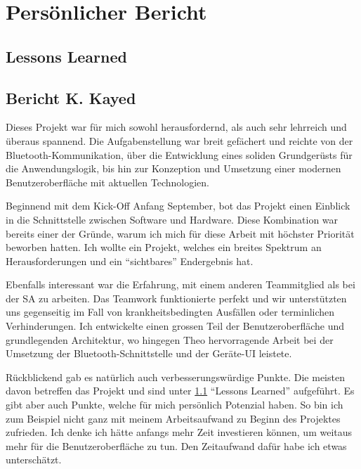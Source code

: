 \section{Persönlicher Bericht}
\label{Persönlicher Bericht}

\subsection{Lessons Learned}
\label{sub:lessons_learned}

\subsection{Bericht K. Kayed}

Dieses Projekt war für mich sowohl herausfordernd, als auch sehr lehrreich und überaus spannend. Die Aufgabenstellung war breit gefächert und reichte von der Bluetooth-Kommunikation, über die Entwicklung eines soliden Grundgerüsts für die Anwendungslogik, bis hin zur Konzeption und Umsetzung einer modernen Benutzeroberfläche mit aktuellen Technologien.

Beginnend mit dem Kick-Off Anfang September, bot das Projekt einen Einblick in die Schnittstelle zwischen Software und Hardware. Diese Kombination war bereits einer der Gründe, warum ich mich für diese Arbeit mit höchster Priorität beworben hatten. Ich wollte ein Projekt, welches ein breites Spektrum an Herausforderungen und ein \enquote{sichtbares} Endergebnis hat.

Ebenfalls interessant war die Erfahrung, mit einem anderen Teammitglied als bei der SA zu arbeiten. Das Teamwork funktionierte perfekt und wir unterstützten uns gegenseitig im Fall von krankheitsbedingten Ausfällen oder terminlichen Verhinderungen. Ich entwickelte einen grossen Teil der Benutzeroberfläche und grundlegenden Architektur, wo hingegen Theo hervorragende Arbeit bei der Umsetzung der Bluetooth-Schnittstelle und der Geräte-UI leistete.

Rückblickend gab es natürlich auch verbesserungswürdige Punkte. Die meisten davon betreffen das Projekt und sind unter \ref{sub:lessons_learned} \enquote{Lessons Learned} aufgeführt. Es gibt aber auch Punkte, welche für mich persönlich Potenzial haben. So bin ich zum Beispiel nicht ganz mit meinem Arbeitsaufwand zu Beginn des Projektes zufrieden. Ich denke ich hätte anfangs mehr Zeit investieren können, um weitaus mehr für die Benutzeroberfläche zu tun. Den Zeitaufwand dafür habe ich etwas unterschätzt.

